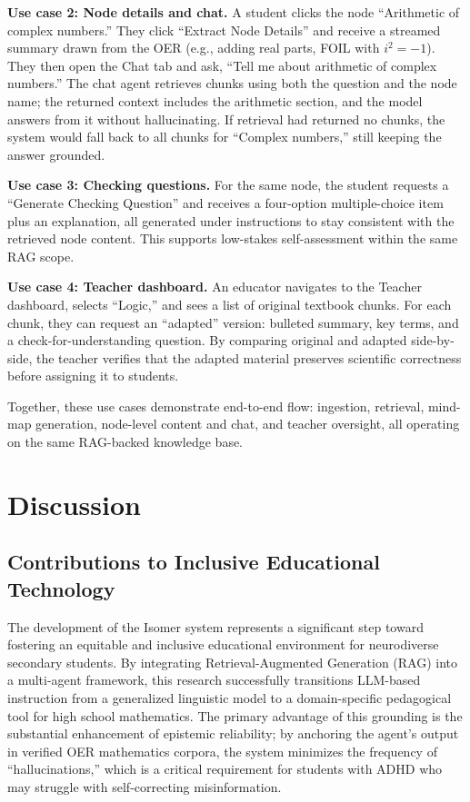 \documentclass[sigplan,screen]{acmart}
\begin{document}
\textbf{Use case 2: Node details and chat.} A student clicks the node ``Arithmetic of complex numbers.'' They click ``Extract Node Details'' and receive a streamed summary drawn from the OER (e.g., adding real parts, FOIL with $i^2=-1$). They then open the Chat tab and ask, ``Tell me about arithmetic of complex numbers.'' The chat agent retrieves chunks using both the question and the node name; the returned context includes the arithmetic section, and the model answers from it without hallucinating. If retrieval had returned no chunks, the system would fall back to all chunks for ``Complex numbers,'' still keeping the answer grounded.

\textbf{Use case 3: Checking questions.} For the same node, the student requests a ``Generate Checking Question'' and receives a four-option multiple-choice item plus an explanation, all generated under instructions to stay consistent with the retrieved node content. This supports low-stakes self-assessment within the same RAG scope.

\textbf{Use case 4: Teacher dashboard.} An educator navigates to the Teacher dashboard, selects ``Logic,'' and sees a list of original textbook chunks. For each chunk, they can request an ``adapted'' version: bulleted summary, key terms, and a check-for-understanding question. By comparing original and adapted side-by-side, the teacher verifies that the adapted material preserves scientific correctness before assigning it to students.

Together, these use cases demonstrate end-to-end flow: ingestion, retrieval, mind-map generation, node-level content and chat, and teacher oversight, all operating on the same RAG-backed knowledge base.

\section{Discussion}

\subsection{Contributions to Inclusive Educational Technology}

The development of the Isomer system represents a significant step toward fostering an equitable and inclusive educational environment for neurodiverse secondary students. By integrating Retrieval-Augmented Generation (RAG) into a multi-agent framework, this research successfully transitions LLM-based instruction from a generalized linguistic model to a domain-specific pedagogical tool for high school mathematics. The primary advantage of this grounding is the substantial enhancement of epistemic reliability; by anchoring the agent's output in verified OER mathematics corpora, the system minimizes the frequency of ``hallucinations,'' which is a critical requirement for students with ADHD who may struggle with self-correcting misinformation.
\end{document}

